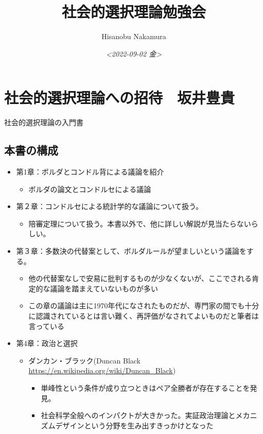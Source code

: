 \documentclass{article}
\author{Hisanobu Nakamura}
\date{\textit{<2022-09-02 金>}}
\title{社会的選択理論勉強会}
\begin{document}
\maketitle
\tableofcontents


\section{社会的選択理論への招待　坂井豊貴}
\label{sec:org528c155}
社会的選択理論の入門書

\subsection{本書の構成}
\label{sec:orgb705f08}
\begin{itemize}
\item 第1章：ボルダとコンドル背による議論を紹介
\begin{itemize}
\item ボルダの論文とコンドルセによる議論
\end{itemize}
\item 第２章：コンドルセによる統計学的な議論について扱う。
\begin{itemize}
\item 陪審定理について扱う。本書以外で、他に詳しい解説が見当たらないらしい。
\end{itemize}
\item 第３章：多数決の代替案として、ボルダルールが望ましいという議論をする。
\begin{itemize}
\item 他の代替案なしで安易に批判するものが少なくないが、ここでされる肯定的な議論を踏まえていないものが多い
\item この章の議論は主に1970年代になされたものだが、専門家の間でも十分に認識されているとは言い難く、再評価がなされてよいものだと筆者は言っている
\end{itemize}
\item 第4章：政治と選択
\begin{itemize}
\item ダンカン・ブラック(Duncan Black \url{https://en.wikipedia.org/wiki/Duncan\_Black})
\begin{itemize}
\item 単峰性という条件が成り立つときはペア全勝者が存在することを発見。
\item 社会科学全般へのインパクトが大きかった。実証政治理論とメカニズムデザインという分野を生み出すきっかけとなった
\end{itemize}
\end{itemize}

\end{itemize}
\end{document}
